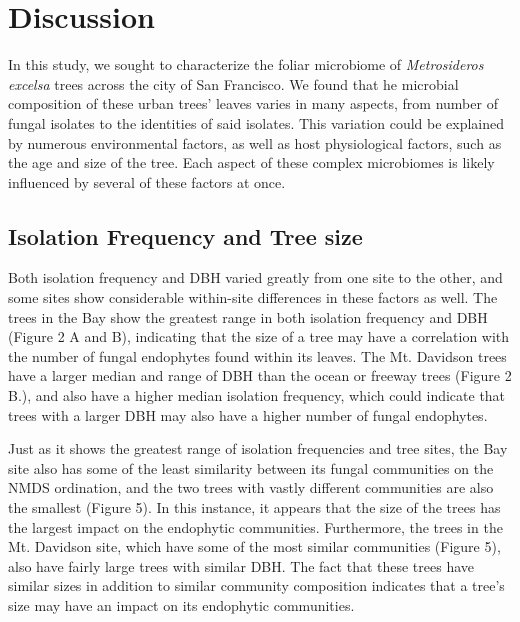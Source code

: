 \documentclass[fleqn,10pt,lineno]{wlpeerj} %
\begin{document}
\hypertarget{discussion}{%
\section{Discussion}\label{discussion}}

In this study, we sought to characterize the foliar microbiome of
\emph{Metrosideros excelsa} trees across the city of San Francisco. We
found that he microbial composition of these urban trees' leaves varies
in many aspects, from number of fungal isolates to the identities of
said isolates. This variation could be explained by numerous
environmental factors, as well as host physiological factors, such as
the age and size of the tree. Each aspect of these complex microbiomes
is likely influenced by several of these factors at once.

\hypertarget{isolation-frequency-and-tree-size}{%
\subsection{Isolation Frequency and Tree
size}\label{isolation-frequency-and-tree-size}}

Both isolation frequency and DBH varied greatly from one site to the
other, and some sites show considerable within-site differences in these
factors as well. The trees in the Bay show the greatest range in both
isolation frequency and DBH (Figure 2 A and B), indicating that the size
of a tree may have a correlation with the number of fungal endophytes
found within its leaves. The Mt. Davidson trees have a larger median and
range of DBH than the ocean or freeway trees (Figure 2 B.), and also
have a higher median isolation frequency, which could indicate that
trees with a larger DBH may also have a higher number of fungal
endophytes.

Just as it shows the greatest range of isolation frequencies and tree
sites, the Bay site also has some of the least similarity between its
fungal communities on the NMDS ordination, and the two trees with vastly
different communities are also the smallest (Figure 5). In this
instance, it appears that the size of the trees has the largest impact
on the endophytic communities. Furthermore, the trees in the Mt.
Davidson site, which have some of the most similar communities (Figure
5), also have fairly large trees with similar DBH. The fact that these
trees have similar sizes in addition to similar community composition
indicates that a tree's size may have an impact on its endophytic
communities.
\end{document}
